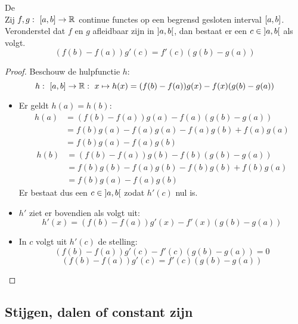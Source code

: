 \documentclass[main.tex]{subfiles}
\begin{document}
\begin{st}
  \label{st:middelwaardestelling-cauchy}
  De \\
  Zij $f,g:\ \interval{a}{b} \rightarrow \mathbb{R}$ continue functes op een begrensd gesloten interval $\interval{a}{b}$.
  Veronderstel dat $f$ en $g$ afleidbaar zijn in $\interval[open]{a}{b}$, dan bestaat er een $c\in \interval[open]{a}{b}$ als volgt.
  \[ \left( f(b) - f(a) \right) g'(c) = f'(c) \left( g(b) - g(a) \right) \]

  \begin{proof}
    Beschouw de hulpfunctie $h$:
    \[ h:\ \interval{a}{b} \rightarrow \mathbb{R}:\ x \mapsto h(x) = (f(b)-f(a))g(x) -f(x)(g(b)-g(a)) \]
    \begin{itemize}
    \item Er geldt $h(a)=h(b)$:
      \[
      \begin{array}{rl}
        h(a) &= (f(b)-f(a))g(a) -f(a)(g(b)-g(a))\\
             &= f(b)g(a)-f(a)g(a)-f(a)g(b)+f(a)g(a)\\
             &= f(b)g(a)-f(a)g(b)
      \end{array}
      \]
      \[
      \begin{array}{rl}
        h(b) &= (f(b)-f(a))g(b) -f(b)(g(b)-g(a))\\
             &= f(b)g(b)-f(a)g(b) -f(b)g(b)+f(b)g(a)\\
             &= f(b)g(a)-f(a)g(b)
      \end{array}
      \]
     Er bestaat dus een $c\in \interval[open]{a}{b}$ zodat $h'(c)$ nul is.
    \item $h'$ ziet er bovendien als volgt uit:
      \[
      h'(x) = (f(b)-f(a))g'(x)-f'(x)(g(b)-g(a))
      \]
   \item In $c$ volgt uit $h'(c)$ de stelling:
     \[
     (f(b)-f(a))g'(c)-f'(c)(g(b)-g(a)) = 0
     \]
     \[
     (f(b)-f(a))g'(c) = f'(c)(g(b)-g(a))
     \]
    \end{itemize}
  \end{proof}
  \feed
\end{st}

\subsection{Stijgen, dalen of constant zijn}
\end{document}
